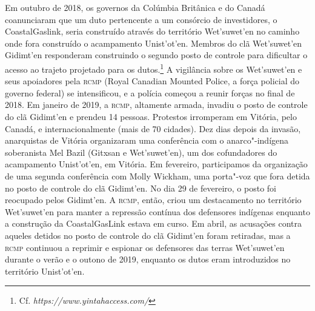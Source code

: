Em outubro de 2018, os governos da Colúmbia Britânica e do Canadá
coanunciaram que um duto pertencente a um consórcio de investidores, o
CoastalGaslink, seria construído através do território Wet'suwet'en no
caminho onde fora construído o acampamento Unist'ot'en. Membros do clã
Wet'suwet'en Gidimt'en responderam construindo o segundo posto de
controle para dificultar o acesso ao trajeto projetado para os
dutos.\footnote{Cf. \emph{https://www.yintahaccess.com/}} A vigilância
sobre os Wet'suwet'en e seus apoiadores pela \textsc{rcmp} (Royal Canadian
Mounted Police, a força policial do governo federal) se intensificou, e
a polícia começou a reunir forças no final de 2018. Em janeiro de 2019,
a \textsc{rcmp}, altamente armada, invadiu o posto de controle do clã Gidimt'en e
prendeu 14 pessoas. Protestos irromperam em Vitória, pelo Canadá, e
internacionalmente (mais de 70 cidades). Dez dias depois da invasão,
anarquistas de Vitória organizaram uma conferência com o anarco"-indígena
soberanista Mel Bazil (Gitxsan e Wet'suwet'en), um dos cofundadores do
acampamento Unist'ot'en, em Vitória. Em fevereiro, participamos da
organização de uma segunda conferência com Molly Wickham, uma porta"-voz
que fora detida no posto de controle do clã Gidimt'en. No dia 29 de
fevereiro, o posto foi reocupado pelos Gidimt'en. A \textsc{rcmp}, então, criou
um destacamento no território Wet'suwet'en para manter a repressão
contínua dos defensores indígenas enquanto a construção da
CoastalGasLink estava em curso. Em abril, as acusações contra aqueles
detidos no posto de controle do clã Gidimt'en foram retiradas, mas a
\textsc{rcmp} continuou a reprimir e espionar os defensores das terras
Wet'suwet'en durante o verão e o outono de 2019, enquanto os dutos eram
introduzidos no território Unist'ot'en.

